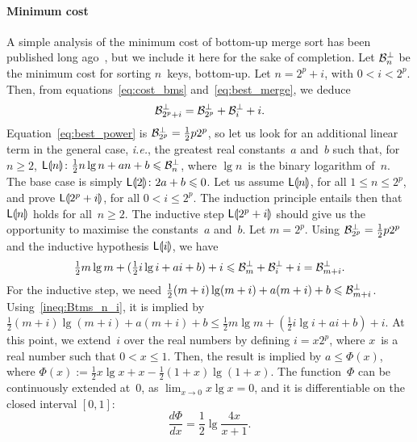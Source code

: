 \paragraph{Minimum cost}

A simple analysis of the minimum cost of bottom-up merge sort has
been published long ago~\cite{McIlroy:1974}, but we include it here
for the sake of completion. Let \(\mathcal{B}_{n}^{\bot}\) be the minimum cost
for sorting \(n\)~keys, bottom-up. Let \(n=2^p+i\), with \(0 < i
< 2^p\). Then, from equations~\eqref{eq:cost_bms}
and~\eqref{eq:best_merge}, we deduce
\begin{equation}
\mathcal{B}_{2^p+i}^{\bot} = \mathcal{B}_{2^p}^{\bot} + \mathcal{B}_{i}^{\bot} + i.
\label{eq:Bbot_2p_i}
\end{equation}
Equation~\eqref{eq:best_power} is \(\mathcal{B}_{2^p}^{\bot} = \frac{1}{2}p2^p\),
so let us look for an additional linear term in the general case,
\emph{i.e.}, the greatest real constants~\(a\) and~\(b\) such that,
for \(n \geqslant 2\), \(\textsf{L}\llparenthesis{n}\rrparenthesis \colon \tfrac{1}{2}n\lg n + an +
b \leqslant \mathcal{B}_{n}^{\bot}\), where \(\lg n\)~is the binary logarithm
of~\(n\). The base case is simply \(\textsf{L}\llparenthesis{2}\rrparenthesis \colon 2a + b
\leqslant 0\). Let us assume \(\textsf{L}\llparenthesis{n}\rrparenthesis\), for all \(1 \leqslant n
\leqslant 2^p\), and prove \(\textsf{L}\llparenthesis{2^p+i}\rrparenthesis\), for all \(0 < i
\leqslant 2^p\). The induction principle entails then that
\(\textsf{L}\llparenthesis{n}\rrparenthesis\) holds for all~\(n \geqslant 2\). The inductive step
\(\textsf{L}\llparenthesis{2^p+i}\rrparenthesis\) should give us the opportunity to maximise the
constants~\(a\) and~\(b\). Let \(m=2^p\). Using \(\mathcal{B}_{2^p}^{\bot} =
\tfrac{1}{2}p2^p\) and the inductive hypothesis \(\textsf{L}\llparenthesis{i}\rrparenthesis\), we
have
\begin{equation}
\tfrac{1}{2}m\lg m + (\tfrac{1}{2}i\lg i + ai + b) + i \leqslant \mathcal{B}_{m}^{\bot} + \mathcal{B}_{i}^{\bot} + i = \mathcal{B}_{m+i}^{\bot}.
\label{ineq:Btms_n_i}
\end{equation}
For the inductive step, we need \(\tfrac{1}{2}(m+i)\lg(m+i) + a(m+i) +
b \leqslant \mathcal{B}_{m+i}^{\bot}\). Using~\eqref{ineq:Btms_n_i}, it is
implied by \(\tfrac{1}{2}(m+i)\lg(m+i) + a(m+i) + b \leqslant
\tfrac{1}{2}m\lg m + (\tfrac{1}{2}i\lg i + ai + b) + i\). At this
point, we extend~\(i\) over the real numbers by defining \(i=x2^p\),
where \(x\)~is a real number such that \(0 < x \leqslant 1\). Then,
the result is implied by \(a \leqslant \Phi(x)\), where \(\Phi(x) :=
\tfrac{1}{2}x\lg x + x - \tfrac{1}{2}(1+x)\lg(1+x)\). The
function~\(\Phi\) can be continuously extended at~\(0\), as \(\lim_{x
  \to 0} x\lg x = 0\), and it is differentiable on the closed interval
\([0,1]\):
\begin{equation}
\frac{d\Phi}{dx} = \frac{1}{2}\lg\frac{4x}{x+1}.
\label{eq:der_Phi}
\end{equation}
